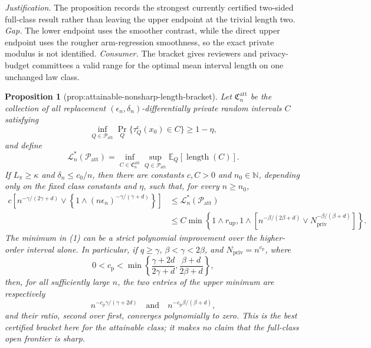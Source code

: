 \documentclass{article}
\newtheorem{proposition}{Proposition}
\begin{document}
\par\smallskip\noindent \textit{Justification.} The proposition records the strongest currently certified two-sided full-class result rather than leaving the upper endpoint at the trivial length two. \textit{Gap.} The lower endpoint uses the smoother contrast, while the direct upper endpoint uses the rougher arm-regression smoothness, so the exact private modulus is not identified. \textit{Consumer.} The bracket gives reviewers and privacy-budget committees a valid range for the optimal mean interval length on one unchanged law class.

\begin{proposition}[prop:attainable-nonsharp-length-bracket]\label{prop:attainable-nonsharp-length-bracket}
Let \(\mathfrak C_n^{\mathrm{att}}\) be the collection of all replacement
\((\epsilon_n,\delta_n)\)-differentially private random intervals \(C\)
satisfying
\[
 \inf_{Q\in\mathcal P_{\mathrm{att}}}
 \Pr_Q\{\tau_Q^{\mathrm c}(x_0)\in C\}\ge1-\eta,
\]
and define
\[
 \mathcal L_n^*(\mathcal P_{\mathrm{att}})
 =\inf_{C\in\mathfrak C_n^{\mathrm{att}}}
   \sup_{Q\in\mathcal P_{\mathrm{att}}}
   \mathbb E_Q[\operatorname{length}(C)].
\]
If \(L_\pi\ge\kappa\) and \(\delta_n\le c_0/n\), then there are
constants \(c,C>0\) and \(n_0\in\mathbb N\), depending only on the fixed
class constants and \(\eta\), such that, for every \(n\ge n_0\),
\[
 \begin{aligned}
 c\left[n^{-\gamma/(2\gamma+d)}
 \vee\left\{1\wedge(n\epsilon_n)^{-\gamma/(\gamma+d)}\right\}\right]
 &\le \mathcal L_n^*(\mathcal P_{\mathrm{att}})\\
 &\le C\min\left\{
 1\wedge r_{\mathrm{up}},
 1\wedge\left[n^{-\beta/(2\beta+d)}
       \vee N_{\mathrm{priv}}^{-\beta/(\beta+d)}\right]
 \right\}.
 \end{aligned}
\tag{1}
\]
The minimum in (1) can be a strict polynomial improvement over the
higher-order interval alone.  In particular, if \(q\ge\gamma\),
\(\beta<\gamma<2\beta\), and
\(N_{\mathrm{priv}}=n^{c_{\mathrm p}}\), where
\[
 0<c_{\mathrm p}<
 \min\left\{\frac{\gamma+2d}{2\gamma+d},
             \frac{\beta+d}{2\beta+d}\right\},
\tag{2}
\]
then, for all sufficiently large \(n\), the two entries of the upper
minimum are respectively
\[
 n^{-c_{\mathrm p}\gamma/(\gamma+2d)}
 \quad\text{and}\quad
 n^{-c_{\mathrm p}\beta/(\beta+d)},
\]
and their ratio, second over first, converges polynomially to zero.  This
is the best certified bracket here for the attainable class; it makes no
claim that the full-class open frontier is sharp.
\end{proposition}
\end{document}
